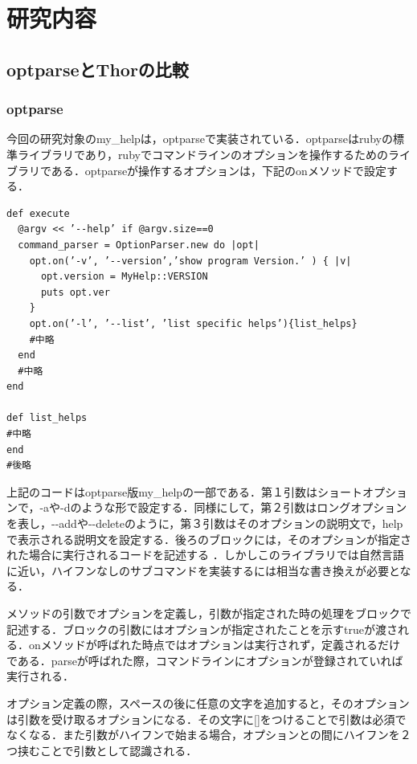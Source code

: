 \chapter{研究内容}\label{ux7814ux7a76ux5185ux5bb9}

\section{optparseとThorの比較}\label{}

\subsection{optparse}\label{optparse}

今回の研究対象のmy\_helpは，optparseで実装されている．optparseはrubyの標準ライブラリであり，rubyでコマンドラインのオプションを操作するためのライブラリである\cite{opt1}．optparseが操作するオプションは，下記のonメソッドで設定する．

\begin{screen}
{\small
\begin{verbatim}
def execute
  @argv << ’--help’ if @argv.size==0
  command_parser = OptionParser.new do |opt|
    opt.on(’-v’, ’--version’,’show program Version.’ ) { |v|
      opt.version = MyHelp::VERSION
      puts opt.ver
    }
    opt.on(’-l’, ’--list’, ’list specific helps’){list_helps}
    #中略
  end
  #中略
end
    
def list_helps
#中略
end
#後略
\end{verbatim}}
\end{screen} 


上記のコードはoptparse版my\_helpの一部である．第１引数はショートオプションで，-aや-dのような形で設定する．同様にして，第２引数はロングオプションを表し，-\/-addや-\/-deleteのように，第３引数はそのオプションの説明文で，helpで表示される説明文を設定する．後ろのブロックには，そのオプションが指定された場合に実行されるコードを記述する
\cite{opt2}．しかしこのライブラリでは自然言語に近い，ハイフンなしのサブコマンドを実装するには相当な書き換えが必要となる．

メソッドの引数でオプションを定義し，引数が指定された時の処理をブロックで記述する．ブロックの引数にはオプションが指定されたことを示すtrueが渡される．onメソッドが呼ばれた時点ではオプションは実行されず，定義されるだけである．parseが呼ばれた際，コマンドラインにオプションが登録されていれば実行される．

オプション定義の際，スペースの後に任意の文字を追加すると，そのオプションは引数を受け取るオプションになる．その文字に{[}{]}をつけることで引数は必須でなくなる．また引数がハイフンで始まる場合，オプションとの間にハイフンを２つ挟むことで引数として認識される．

